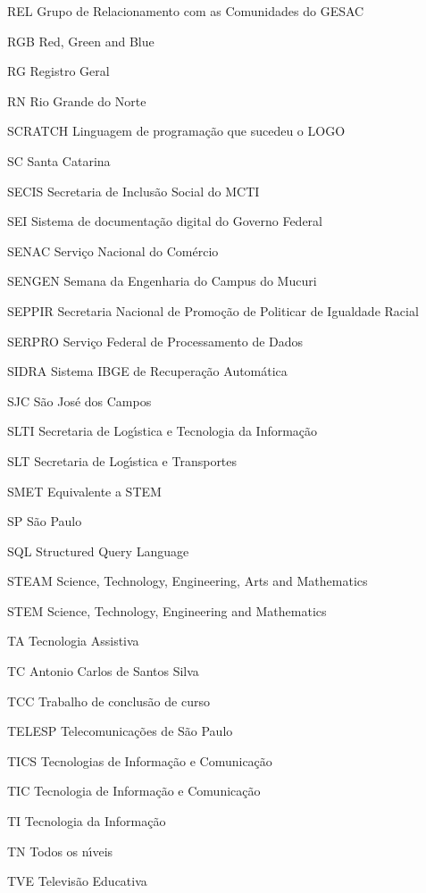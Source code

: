 \begin{siglas}
\item[REL] Grupo de Relacionamento com as Comunidades do GESAC
\item[RGB] Red, Green and Blue
\item[RG] Registro Geral
\item[RN] Rio Grande do Norte
\item[SCRATCH] Linguagem de programa\c{c}\~ao que sucedeu o LOGO
\item[SC] Santa Catarina
\item[SECIS] Secretaria de Inclus\~ao Social do MCTI
\item[SEI] Sistema de documenta\c{c}\~ao digital do Governo Federal
\item[SENAC] Servi\c{c}o Nacional do Com\'ercio
\item[SENGEN]  Semana da Engenharia do Campus do Mucuri
\item[SEPPIR] Secretaria Nacional de Promo\c{c}\~ao de Politicar de Igualdade Racial
\item[SERPRO] Servi\c{c}o Federal de Processamento de Dados
\item[SIDRA] Sistema IBGE de Recupera\c{c}\~ao Autom\'atica
\item[SJC] S\~ao Jos\'e dos Campos
\item[SLTI]  Secretaria de Log\'{\i}stica e Tecnologia da Informa\c{c}\~ao 
\item[SLT]  Secretaria de Log\'{\i}stica e Transportes
\item[SMET] Equivalente a STEM
\item[SP] S\~ao Paulo
\item[SQL] Structured Query Language
\item[STEAM] Science, Technology, Engineering, Arts and Mathematics
\item[STEM]  Science, Technology, Engineering and Mathematics
\item[TA] Tecnologia Assistiva
\item[TC] Antonio Carlos de Santos Silva
\item[TCC] Trabalho de conclus\~ao de curso
\item[TELESP] Telecomunica\c{c}\~oes de S\~ao Paulo
\item[TICS] Tecnologias de Informa\c{c}\~ao e Comunica\c{c}\~ao
\item[TIC] Tecnologia de Informa\c{c}\~ao e Comunica\c{c}\~ao
\item[TI] Tecnologia da Informa\c{c}\~ao
\item[TN] Todos os n\'{\i}veis
\item[TVE] Televis\~ao Educativa

\end{siglas}
